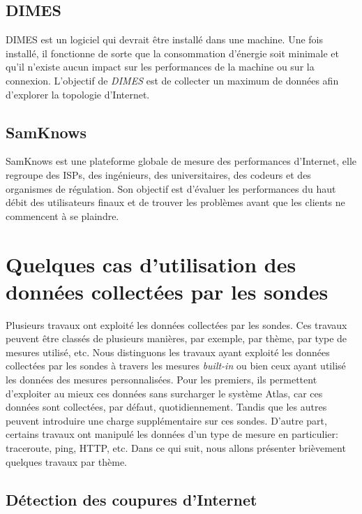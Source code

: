 \subsection{DIMES}
DIMES \cite{Shavitt:2005:DLI:1096536.1096546} est un logiciel qui devrait être installé dans une machine. Une fois installé, il fonctionne de sorte que la consommation d'énergie soit minimale et qu'il n'existe aucun impact sur les performances de la machine ou sur la connexion. L'objectif de \textit{DIMES} est de collecter un maximum de données afin d'explorer la topologie d'Internet.


\subsection{SamKnows}
SamKnows \cite{SamKnows}  est une plateforme globale de mesure des performances d'Internet, elle regroupe des ISPs, des ingénieurs, des universitaires, des codeurs et des organismes de régulation. Son objectif est d'évaluer les performances du haut débit des utilisateurs finaux et de trouver les problèmes avant que les clients ne commencent à se plaindre. 

\section{Quelques cas d'utilisation des données collectées par les sondes} \label{use-cases-atlas}
Plusieurs travaux ont exploité les données collectées par les sondes. Ces travaux peuvent être classés de plusieurs manières, par exemple,  par thème,  par  type de mesures utilisé, etc. Nous distinguons les travaux ayant exploité les données collectées par les sondes  à travers les mesures \textit{built-in} ou bien ceux ayant utilisé les données des mesures personnalisées.  Pour les premiers, ils permettent d'exploiter au mieux ces données sans surcharger le système Atlas, car ces données sont collectées, par défaut, quotidiennement. Tandis que les autres peuvent introduire une charge supplémentaire sur ces sondes. D'autre part, certains travaux  ont manipulé  les données d'un  type de mesure en particulier: traceroute, ping,  HTTP, etc. Dans ce qui suit, nous allons présenter brièvement quelques travaux par thème.

\subsection{Détection des coupures d'Internet}

